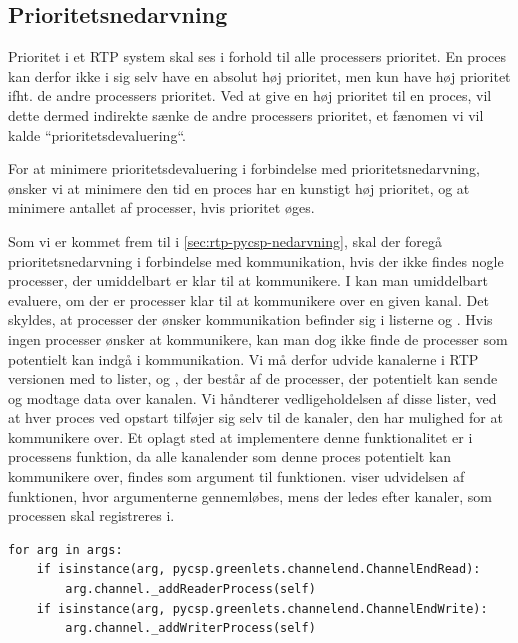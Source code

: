 \subsection{Prioritetsnedarvning}
\label{sec:deadline-implementation-priorityinheritance}
Prioritet i et RTP system skal ses i forhold til alle processers prioritet. En proces kan derfor ikke i sig selv have en absolut høj prioritet, men kun have høj prioritet ifht. de andre processers prioritet. Ved at give en høj prioritet til  en proces, vil dette dermed  indirekte sænke de andre processers prioritet, et fænomen vi vil kalde ``prioritetsdevaluering``.

For at minimere prioritetsdevaluering i forbindelse med prioritetsnedarvning, ønsker vi at minimere den tid en proces har en kunstigt høj prioritet, og at minimere antallet af processer, hvis prioritet øges. 

Som vi er kommet frem til i \cref{sec:rtp-pycsp-nedarvning}, skal  der foregå  prioritetsnedarvning i forbindelse med kommunikation, hvis der ikke findes nogle processer, der umiddelbart er klar til at kommunikere.  I \pycsp kan man umiddelbart evaluere, om der er processer klar til at kommunikere over en given kanal. Det skyldes, at processer der ønsker kommunikation befinder sig i listerne  og . Hvis ingen processer ønsker at kommunikere, kan man dog ikke finde de processer som potentielt kan indgå i kommunikation.
Vi må derfor udvide kanalerne i RTP versionen med to lister,  og , der består af de processer, der potentielt kan sende og modtage data over kanalen. Vi håndterer vedligeholdelsen af disse lister, ved at hver proces ved opstart tilføjer sig selv til de kanaler, den har mulighed for at kommunikere over. Et oplagt sted at implementere denne funktionalitet er i processens    funktion, da alle kanalender som denne proces potentielt kan kommunikere over, findes som argument til   funktionen.  viser udvidelsen af funktionen, hvor argumenterne gennemløbes, mens der ledes efter kanaler, som processen skal registreres i.

\begin{lstlisting}[firstnumber=29 ,float=hbtp, label=lst:process-init, caption=Uddrag af \code{Process}' \code{\_\_init\_\_}funktion]
for arg in args:
    if isinstance(arg, pycsp.greenlets.channelend.ChannelEndRead):
        arg.channel._addReaderProcess(self)
    if isinstance(arg, pycsp.greenlets.channelend.ChannelEndWrite):
        arg.channel._addWriterProcess(self)  
\end{lstlisting}

